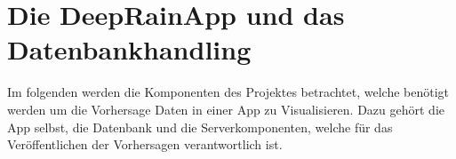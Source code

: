 \section{Die DeepRainApp und das Datenbankhandling}\label{die deeprain app und das datenbankhandling}  
Im folgenden werden die Komponenten des Projektes betrachtet, welche benötigt werden um die Vorhersage Daten in einer 
App zu Visualisieren.
Dazu gehört die App selbst, die Datenbank und die Serverkomponenten, welche für das Veröffentlichen der Vorhersagen 
verantwortlich ist. 





